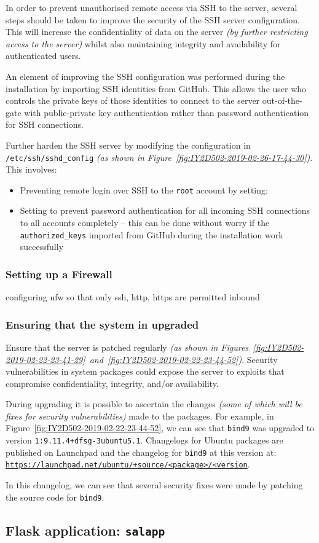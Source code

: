 In order to prevent unauthorised remote access via SSH to the server, several steps should be taken to improve the security of the SSH server configuration. This will increase the confidentiality of data on the server \textit{(by further restricting access to the server)} whilst also maintaining integrity and availability for authenticated users.

An element of improving the SSH configuration was performed during the installation by importing SSH identities from GitHub. This allows the user who controls the private keys of those identities to connect to the server out-of-the-gate with public-private key authentication rather than password authentication for SSH connections.

Further harden the SSH server by modifying the configuration in \texttt{/etc/ssh/sshd\_config} \textit{(as shown in Figure~\ref{fig:IY2D502-2019-02-26-17-44-30})}. This involves:
\begin{itemize}
  \item Preventing remote login over SSH to the \texttt{root} account by setting:\\
  \item Setting  to prevent password authentication for all incoming SSH connections to all accounts completely -- this can be done without worry if the \texttt{authorized\_keys} imported from GitHub during the installation work successfully
\end{itemize}

\subsubsection{Setting up a Firewall}
configuring ufw so that only ssh, http, https are permitted inbound
\subsubsection{Ensuring that the system in upgraded}
Ensure that the server is patched regularly \textit{(as shown in Figures~\ref{fig:IY2D502-2019-02-22-23-41-29}~and~\ref{fig:IY2D502-2019-02-22-23-44-52})}. Security vulnerabilities in system packages could expose the server to exploits that compromise confidentiality, integrity, and/or availability.

During upgrading it is possible to ascertain the changes \textit{(some of which will be fixes for security vulnerabilities)} made to the packages. For example, in Figure~\ref{fig:IY2D502-2019-02-22-23-44-52}, we can see that \texttt{bind9} was upgraded to version \texttt{1:9.11.4+dfsg-3ubuntu5.1}. Changelogs for Ubuntu packages are published on Launchpad and the changelog for \texttt{bind9} at this version at:\\
\href{https://launchpad.net/ubuntu/+source/bind9/1:9.11.4+dfsg-3ubuntu5.1}{\texttt{https://launchpad.net/ubuntu/+source/<package>/<version}}.

In this changelog, we can see that several security fixes were made by patching the source code for \texttt{bind9}.

\pagebreak
\subsection{Flask application: \texttt{salapp}}
